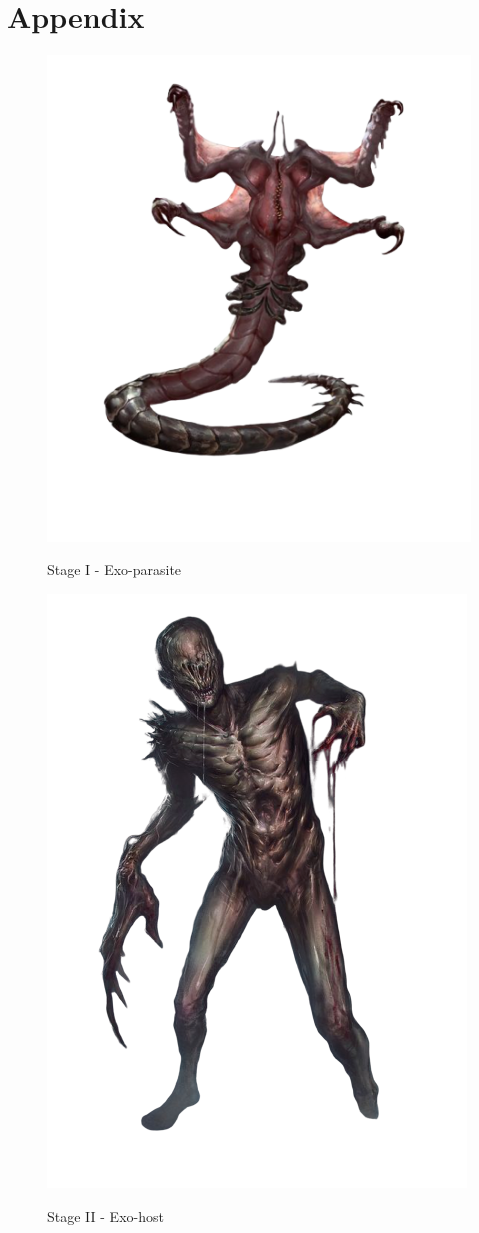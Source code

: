 \chapter{Appendix}



\begin{figure}
    \centering
    \includegraphics[width=.45\textwidth]{img/stage-I-bg.png}
    \label{fig:stage-1}
    \caption*{Stage I - Exo-parasite}
\end{figure}

\clearpage

\begin{figure}
    \centering
    \includegraphics[width=.45\textwidth]{img/stage-II-bg.png}
    \label{fig:stage-2}
    \caption*{Stage II - Exo-host}
\end{figure}


\clearpage

